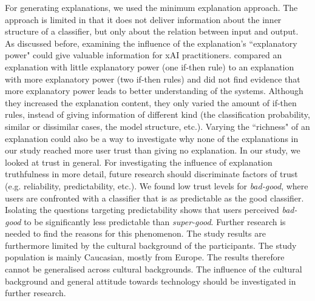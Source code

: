 For generating explanations, we used the minimum explanation approach. The approach is limited in that it does not deliver information about the inner structure of a classifier, but only about the relation between input and output. As discussed before, examining the influence of the explanation's ``explanatory power" could give valuable information for xAI practitioners. \cite{ribeiro2018anchors} compared an explanation with little explanatory power (one if-then rule) to an explanation with more explanatory power (two if-then rules) and did not find evidence that more explanatory power leads to better understanding of the systems. Although they increased the explanation content, they only varied the amount of if-then rules, instead of giving information of different kind (the classification probability, similar or dissimilar cases, the model structure, etc.). Varying the ``richness" of an explanation could also be a way to investigate why none of the explanations in our study reached more user trust than giving no explanation.\newline
In our study, we looked at trust in general. For investigating the influence of explanation truthfulness in more detail, future research should discriminate factors of trust (e.g. reliability, predictability, etc.). We found low trust levels for \textit{bad-good}, where users are confronted with a classifier that is as predictable as the good classifier. Isolating the questions targeting predictability shows that users perceived \textit{bad-good} to be significantly less predictable than \textit{super-good}. Further research is needed to find the reasons for this phenomenon.\newline
The study results are furthermore limited by the cultural background of the participants. The study population is mainly Caucasian, mostly from Europe. The results therefore cannot be generalised across cultural backgrounds. The influence of the cultural background and general attitude towards technology should be investigated in further research.
